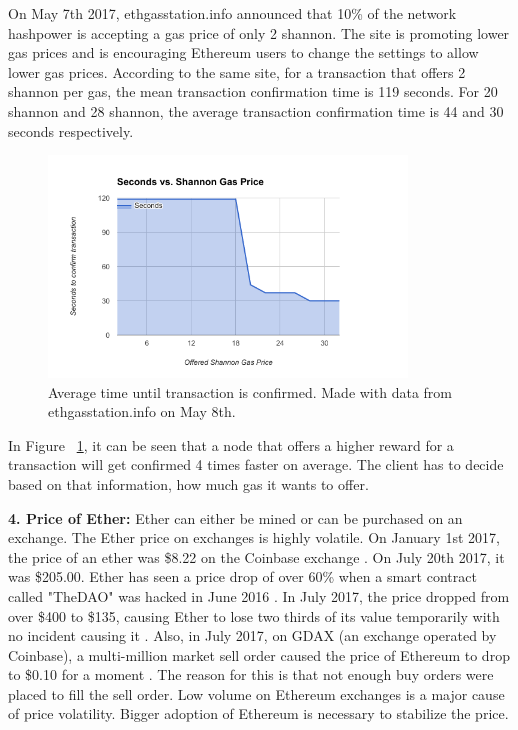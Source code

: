 On May 7th 2017, ethgasstation.info announced \cite{ETHGasStationAnnouncement} that 10\% of the network hashpower is accepting a gas price of only 2 shannon. The site is promoting lower gas prices and is encouraging Ethereum users to change the settings to allow lower gas prices. According to the same site, for a transaction that offers 2 shannon per gas, the mean transaction confirmation time is 119 seconds. For 20 shannon and 28 shannon, the average transaction confirmation time is 44 and 30 seconds respectively.

\begin{figure}[H]
\centering
\includegraphics[width=0.85\textwidth]{gas-vs-transaction-time.png}
\caption{Average time until transaction is confirmed. Made with data from ethgasstation.info on May 8th.}
\label{fig:gas}
\end{figure}

In Figure ~\ref{fig:gas}, it can be seen that a node that offers a higher reward for a transaction will get confirmed 4 times faster on average. The client has to decide based on that information, how much gas it wants to offer.

\textbf{4. Price of Ether:} Ether can either be mined or can be purchased on an exchange. The Ether price on exchanges is highly volatile. On January 1st 2017, the price of an ether was \$8.22 on the Coinbase exchange \cite{Coinbase}. On July 20th 2017, it was \$205.00. Ether has seen a price drop of over 60\% when a smart contract called "TheDAO" was hacked in June 2016 \cite{DAO}. In July 2017, the price dropped from over \$400 to \$135, causing Ether to lose two thirds of its value temporarily with no incident causing it \cite{Coinbase}. Also, in July 2017, on GDAX (an exchange operated by Coinbase), a multi-million market sell order caused the price of Ethereum to drop to \$0.10 for a moment \cite{EthereumCent}. The reason for this is that not enough buy orders were placed to fill the sell order. Low volume on Ethereum exchanges is a major cause of price volatility. Bigger adoption of Ethereum is necessary to stabilize the price.

